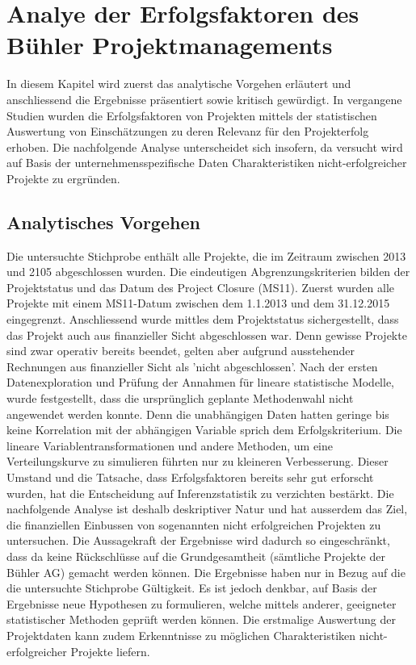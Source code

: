 \section{Analye der Erfolgsfaktoren des Bühler Projektmanagements}\label{drei}
In diesem Kapitel wird zuerst das analytische Vorgehen erläutert und anschliessend die Ergebnisse präsentiert sowie kritisch gewürdigt. In vergangene Studien wurden die Erfolgsfaktoren von Projekten mittels der statistischen Auswertung von Einschätzungen zu deren Relevanz für den Projekterfolg erhoben. Die nachfolgende Analyse unterscheidet sich insofern, da versucht wird auf Basis der unternehmensspezifische Daten  Charakteristiken nicht-erfolgreicher Projekte zu ergründen.
\subsection{Analytisches Vorgehen}
Die untersuchte Stichprobe enthält alle Projekte, die im Zeitraum zwischen 2013 und 2105 abgeschlossen wurden. Die eindeutigen Abgrenzungskriterien bilden der Projektstatus und das Datum des Project Closure (MS11). Zuerst wurden alle Projekte mit einem MS11-Datum zwischen dem 1.1.2013 und dem 31.12.2015 eingegrenzt. Anschliessend wurde mittles dem Projektstatus sichergestellt, dass das Projekt auch aus finanzieller Sicht abgeschlossen war. Denn gewisse Projekte sind zwar operativ bereits beendet, gelten aber aufgrund ausstehender Rechnungen aus finanzieller Sicht als 'nicht abgeschlossen'.
\newline Nach der ersten Datenexploration und Prüfung der Annahmen für lineare statistische Modelle, wurde festgestellt, dass die ursprünglich geplante Methodenwahl nicht angewendet werden konnte. Denn die unabhängigen Daten hatten geringe bis keine Korrelation mit der abhängigen Variable sprich dem Erfolgskriterium. Die lineare Variablentransformationen und andere Methoden, um eine Verteilungskurve zu simulieren führten nur zu kleineren Verbesserung. Dieser Umstand und die Tatsache, dass Erfolgsfaktoren bereits sehr gut erforscht wurden, hat die Entscheidung auf Inferenzstatistik zu verzichten bestärkt. Die nachfolgende Analyse ist deshalb deskriptiver Natur und hat ausserdem das Ziel, die finanziellen Einbussen von sogenannten nicht erfolgreichen Projekten zu untersuchen. Die Aussagekraft der Ergebnisse wird dadurch so eingeschränkt, dass da keine Rückschlüsse auf die Grundgesamtheit (sämtliche Projekte der Bühler AG) gemacht werden können.  Die Ergebnisse haben nur in Bezug auf die die untersuchte Stichprobe Gültigkeit. Es ist jedoch denkbar, auf Basis der Ergebnisse neue Hypothesen zu formulieren, welche mittels anderer, geeigneter statistischer Methoden geprüft werden können. Die erstmalige Auswertung der Projektdaten kann zudem Erkenntnisse zu möglichen Charakteristiken nicht-erfolgreicher Projekte liefern.
